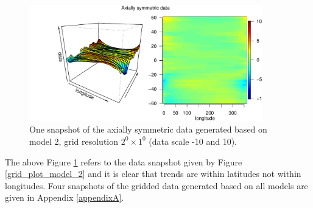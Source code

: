 \begin{figure}[H]
	\begin{center}
		\includegraphics [width=0.9\textwidth ]{graphs/Data_sample_120_model2_density.pdf}
		\caption[One Snapshot of The Axially Symmetric Data Generated Based on Model 2]{One snapshot of the axially symmetric data generated based on model 2, grid resolution $2^0\times 1^0$ (data scale -10 and 10).}
			\label{grid_plot_model2_sim2}
	\end{center}
\end{figure}
The above Figure \ref{grid_plot_model2_sim2} refers to the data snapshot given by Figure \eqref{grid_plot_model_2} and it is clear that trends are within latitudes not within longitudes. Four snapshots of the gridded data generated based on all models are given in Appendix \ref{appendixA}.

%

